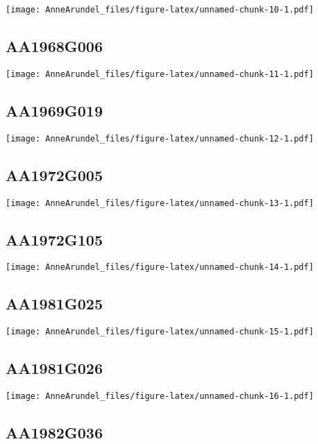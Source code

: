 \documentclass[
]{article}
\begin{document}
\texttt{[image: AnneArundel\_files/figure-latex/unnamed-chunk-10-1.pdf]}

\hypertarget{aa1968g006}{%
\subsection{AA1968G006}\label{aa1968g006}}

\texttt{[image: AnneArundel\_files/figure-latex/unnamed-chunk-11-1.pdf]}

\hypertarget{aa1969g019}{%
\subsection{AA1969G019}\label{aa1969g019}}

\texttt{[image: AnneArundel\_files/figure-latex/unnamed-chunk-12-1.pdf]}

\hypertarget{aa1972g005}{%
\subsection{AA1972G005}\label{aa1972g005}}

\texttt{[image: AnneArundel\_files/figure-latex/unnamed-chunk-13-1.pdf]}

\hypertarget{aa1972g105}{%
\subsection{AA1972G105}\label{aa1972g105}}

\texttt{[image: AnneArundel\_files/figure-latex/unnamed-chunk-14-1.pdf]}

\hypertarget{aa1981g025}{%
\subsection{AA1981G025}\label{aa1981g025}}

\texttt{[image: AnneArundel\_files/figure-latex/unnamed-chunk-15-1.pdf]}

\hypertarget{aa1981g026}{%
\subsection{AA1981G026}\label{aa1981g026}}

\texttt{[image: AnneArundel\_files/figure-latex/unnamed-chunk-16-1.pdf]}

\hypertarget{aa1982g036}{%
\subsection{AA1982G036}\label{aa1982g036}}
\end{document}
